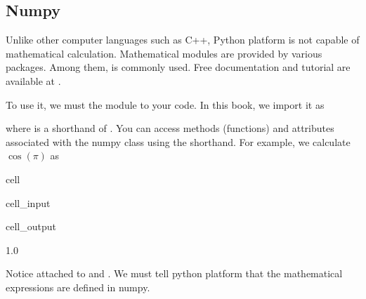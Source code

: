 \documentclass[letterpaper,10pt,english]{jupyterBook}
\begin{document}
\subsection{Numpy}
\label{\detokenize{preparation/python:numpy}}
\sphinxAtStartPar
Unlike other computer languages such as C++, Python platform is not capable of mathematical calculation. Mathematical modules are provided by various packages.  Among them,  is commonly used.  Free documentation and tutorial are available at .

\sphinxAtStartPar
To use it, we must  the module to your code.  In this book, we import it as

\begin{sphinxVerbatim}[commandchars=\\\{\}]
   
\end{sphinxVerbatim}

\sphinxAtStartPar
where  is a shorthand of .  You can access methods (functions) and attributes associated with the numpy class using the shorthand.  For example, we calculate \(\cos(\pi)\) as

\begin{sphinxuseclass}{cell}\begin{sphinxVerbatimInput}

\begin{sphinxuseclass}{cell_input}
\begin{sphinxVerbatim}[commandchars=\\\{\}]
   

\end{sphinxVerbatim}

\end{sphinxuseclass}\end{sphinxVerbatimInput}
\begin{sphinxVerbatimOutput}

\begin{sphinxuseclass}{cell_output}
\begin{sphinxVerbatim}[commandchars=\\\{\}]
\PYGZhy{}1.0
\end{sphinxVerbatim}

\end{sphinxuseclass}\end{sphinxVerbatimOutput}

\end{sphinxuseclass}
\sphinxAtStartPar
Notice  attached to  and .  We must tell python platform that the mathematical expressions are defined in numpy.
\end{document}
